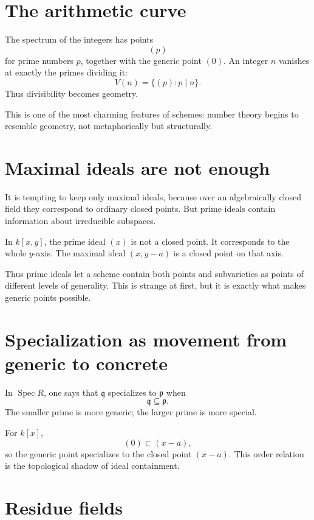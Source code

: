 \section{The arithmetic curve}

The spectrum of the integers has points
\[
  (p)
\]
for prime numbers \(p\), together with the generic point \((0)\). An integer \(n\) vanishes at exactly the primes dividing it:
\[
  V(n)=\{(p):p\mid n\}.
\]
Thus divisibility becomes geometry.

This is one of the most charming features of schemes: number theory begins to resemble geometry, not metaphorically but structurally.


\section{Maximal ideals are not enough}

It is tempting to keep only maximal ideals, because over an algebraically closed field they correspond to ordinary closed points.  But prime ideals contain information about irreducible subspaces.

In \(k[x,y]\), the prime ideal \((x)\) is not a closed point.  It corresponds to the whole \(y\)-axis.  The maximal ideal \((x,y-a)\) is a closed point on that axis.

Thus prime ideals let a scheme contain both points and subvarieties as points of different levels of generality.  This is strange at first, but it is exactly what makes generic points possible.

\section{Specialization as movement from generic to concrete}

In \(\operatorname{Spec}R\), one says that \(\mathfrak q\) specializes to \(\mathfrak p\) when
\[
  \mathfrak q\subseteq\mathfrak p.
\]
The smaller prime is more generic; the larger prime is more special.

For \(k[x]\),
\[
  (0)\subset (x-a),
\]
so the generic point specializes to the closed point \((x-a)\).  This order relation is the topological shadow of ideal containment.

\section{Residue fields}

